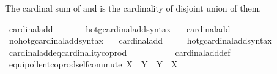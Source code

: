 \begin{isabellebody}
\begin{isamarkuptext}
The cardinal sum of \isa{{\isasymkappa}} and \isa{{\isasymmu}} is the cardinality of disjoint union of them.%
\end{isamarkuptext}\isamarkuptrue%
\isamarkupfalse%
\ {\isachardoublequoteopen}cardinal{\isacharunderscore}{\kern0pt}add\ {\isasymkappa}\ {\isasymmu}\ {\isasymequiv}\ {\isacharbar}{\kern0pt}{\isasymkappa}\ {\isasymCoprod}\ {\isasymmu}{\isacharbar}{\kern0pt}{\isachardoublequoteclose}\isanewline
\isanewline
{}\isamarkupfalse%
\ hotg{\isacharunderscore}{\kern0pt}cardinal{\isacharunderscore}{\kern0pt}add{\isacharunderscore}{\kern0pt}syntax\ \ \isamarkupfalse%
\ cardinal{\isacharunderscore}{\kern0pt}add\ {\isacharparenleft}{\kern0pt}\ {\isachardoublequoteopen}{\isasymoplus}{\isachardoublequoteclose}\ {}{}{\isacharparenright}{\kern0pt}\ \isamarkupfalse%
\isanewline
{}\isamarkupfalse%
\ no{\isacharunderscore}{\kern0pt}hotg{\isacharunderscore}{\kern0pt}cardinal{\isacharunderscore}{\kern0pt}add{\isacharunderscore}{\kern0pt}syntax\ \ \isamarkupfalse%
\ cardinal{\isacharunderscore}{\kern0pt}add\ {\isacharparenleft}{\kern0pt}\ {\isachardoublequoteopen}{\isasymoplus}{\isachardoublequoteclose}\ {}{}{\isacharparenright}{\kern0pt}\ \isamarkupfalse%
\isanewline
{}\isamarkupfalse%
\ hotg{\isacharunderscore}{\kern0pt}cardinal{\isacharunderscore}{\kern0pt}add{\isacharunderscore}{\kern0pt}syntax\isanewline
\isanewline
{}\isamarkupfalse%
\ cardinal{\isacharunderscore}{\kern0pt}add{\isacharunderscore}{\kern0pt}eq{\isacharunderscore}{\kern0pt}cardinality{\isacharunderscore}{\kern0pt}coprod{\isacharcolon}{\kern0pt}\ {\isachardoublequoteopen}{\isasymkappa}\ {\isasymoplus}\ {\isasymmu}\ {\isacharequal}{\kern0pt}\ {\isacharbar}{\kern0pt}{\isasymkappa}\ {\isasymCoprod}\ {\isasymmu}{\isacharbar}{\kern0pt}{\isachardoublequoteclose}\isanewline
%
\isadelimproof
\ \ %
\endisadelimproof
%
\isatagproof
{}\isamarkupfalse%
\ cardinal{\isacharunderscore}{\kern0pt}add{\isacharunderscore}{\kern0pt}def\ \isacommand{{\isachardot}{\kern0pt}{\isachardot}{\kern0pt}}\isamarkupfalse%
%
\endisatagproof
{\isafoldproof}%
%
\isadelimproof
\isanewline
%
\endisadelimproof
\isanewline
{}\isamarkupfalse%
\ equipollent{\isacharunderscore}{\kern0pt}coprod{\isacharunderscore}{\kern0pt}self{\isacharunderscore}{\kern0pt}commute{\isacharcolon}{\kern0pt}\ {\isachardoublequoteopen}X\ {\isasymCoprod}\ Y\ {\isasymapprox}\ Y\ {\isasymCoprod}\ X{\isachardoublequoteclose}\isanewline

\end{isabellebody}
